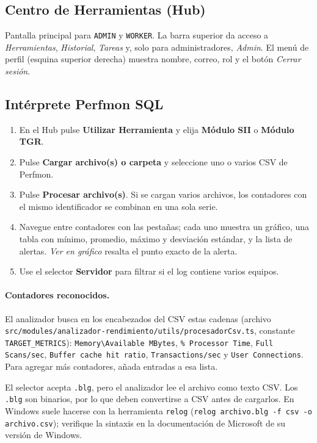 \documentclass[11pt,a4paper]{article}
\newcommand{\ruta}[1]{\texttt{#1}}
\begin{document}
\subsection{Centro de Herramientas (Hub)}
Pantalla principal para \texttt{ADMIN} y \texttt{WORKER}. La barra superior da acceso a
\emph{Herramientas}, \emph{Historial}, \emph{Tareas} y, solo para administradores,
\emph{Admin}. El menú de perfil (esquina superior derecha) muestra nombre, correo, rol
y el botón \emph{Cerrar sesión}.

\subsection{Intérprete Perfmon SQL}
\begin{enumerate}[leftmargin=*]
  \item En el Hub pulse \textbf{Utilizar Herramienta} y elija \textbf{Módulo SII} o
        \textbf{Módulo TGR}.
  \item Pulse \textbf{Cargar archivo(s) o carpeta} y seleccione uno o varios CSV de Perfmon.
  \item Pulse \textbf{Procesar archivo(s)}. Si se cargan varios archivos, los contadores
        con el mismo identificador se combinan en una sola serie.
  \item Navegue entre contadores con las pestañas; cada uno muestra un gráfico, una tabla
        con mínimo, promedio, máximo y desviación estándar, y la lista de alertas.
        \emph{Ver en gráfico} resalta el punto exacto de la alerta.
  \item Use el selector \textbf{Servidor} para filtrar si el log contiene varios equipos.
\end{enumerate}

\paragraph{Contadores reconocidos.} El analizador busca en los encabezados del CSV estas
cadenas (archivo \ruta{src/modules/analizador-rendimiento/utils/procesadorCsv.ts},
constante \texttt{TARGET\_METRICS}):
\texttt{Memory\textbackslash Available MBytes}, \texttt{\% Processor Time},
\texttt{Full Scans/sec}, \texttt{Buffer cache hit ratio}, \texttt{Transactions/sec} y
\texttt{User Connections}. Para agregar más contadores, añada entradas a esa lista.

\begin{aviso}
El selector acepta \texttt{.blg}, pero el analizador lee el archivo como texto CSV.
Los \texttt{.blg} son binarios, por lo que deben convertirse a CSV antes de cargarlos.
En Windows suele hacerse con la herramienta \texttt{relog}
(\texttt{relog archivo.blg -f csv -o archivo.csv}); verifique la sintaxis en la
documentación de Microsoft de su versión de Windows.
\end{aviso}
\end{document}
